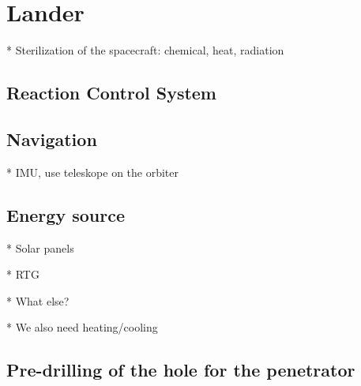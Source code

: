 \chapter{Lander}

* Sterilization of the spacecraft: chemical, heat, radiation




\section{Reaction Control System}

\section{Navigation}

* IMU, use teleskope on the orbiter

\section{Energy source}

* Solar panels

* RTG

* What else?

* We also need heating/cooling

\section{Pre-drilling of the hole for the penetrator}
